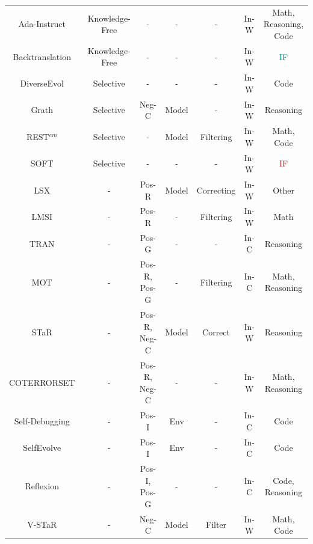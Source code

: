 \documentclass[sn-basic, Numbered]{sn-jnl}%
\theoremstyle{thmstyleone}%
\theoremstyle{thmstyletwo}%
\theoremstyle{thmstylethree}%
\begin{document}
\begin{table}
\begin{tabular}{ccccccc}
Ada-Instruct~\cite{cui2023ada}        & Knowledge-Free   & -        & -          & -           & In-W       & Math, Reasoning, Code \\
Backtranslation~\cite{li2023self}     & Knowledge-Free   & -        & -          & -           & In-W       & \textcolor{teal}{IF}                \\
DiverseEvol~\cite{wu2023self}         & Selective      & -    & -          & -           & In-W       & Code              \\
Grath~\cite{chen2024grath}            & Selective      & Neg-C    & Model      & -           & In-W       & Reasoning         \\
REST$^{em}$~\cite{singh2023beyond}    & Selective      & -        & Model      & Filtering   & In-W       & Math, Code        \\
SOFT~\cite{wang2024step}              & Selective      & -        & -          & -           & In-W       & \textcolor{brown}{IF}        \\
LSX~\cite{stammer2023learning}        & -          & Pos-R    & Model      & Correcting  & In-W       & Other             \\
LMSI~\cite{huang2022large}            & -          & Pos-R    & -          & Filtering   & In-W       & Math              \\
TRAN~\cite{yang2023failures}          & -              & Pos-G    & -          & -           & In-C       & Reasoning         \\
MOT~\cite{li2023mot}                  & -          & Pos-R, Pos-G & -    & Filtering   & In-C       & Math, Reasoning   \\
STaR~\cite{zelikman2022star}          & -          & Pos-R, Neg-C & Model & Correct     & In-W       & Reasoning         \\
COTERRORSET~\cite{tong2024can}        & -          & Pos-R, Neg-C & -    & -           & In-W       & Math, Reasoning   \\
Self-Debugging~\cite{chen2023teaching} & -            & Pos-I    & Env        & -           & In-C       & Code              \\
SelfEvolve~\cite{jiang2023selfevolve} & -          & Pos-I    & Env          & -           & In-C       & Code              \\
Reflexion~\cite{shinn2023reflexion}   & -          & Pos-I, Pos-G & -    & -           & In-C       & Code, Reasoning   \\
V-STaR~\cite{hosseini2024v}           & -              & Neg-C    & Model      & Filter      & In-W       & Math, Code        \\

\end{tabular}
\end{table}
\end{document}
